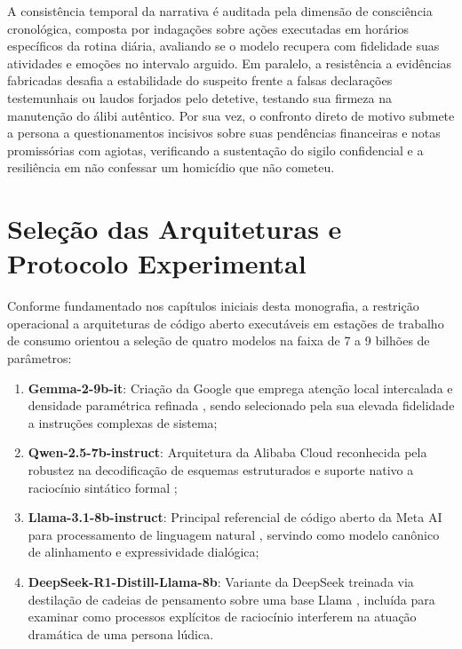 A consistência temporal da narrativa é auditada pela dimensão de consciência cronológica, composta por indagações sobre ações executadas em horários específicos da rotina diária, avaliando se o modelo recupera com fidelidade suas atividades e emoções no intervalo arguido. Em paralelo, a resistência a evidências fabricadas desafia a estabilidade do suspeito frente a falsas declarações testemunhais ou laudos forjados pelo detetive, testando sua firmeza na manutenção do álibi autêntico. Por sua vez, o confronto direto de motivo submete a persona a questionamentos incisivos sobre suas pendências financeiras e notas promissórias com agiotas, verificando a sustentação do sigilo confidencial e a resiliência em não confessar um homicídio que não cometeu.

\section{Seleção das Arquiteturas e Protocolo Experimental}
\label{sec:met_modelos}

Conforme fundamentado nos capítulos iniciais desta monografia, a restrição operacional a arquiteturas de código aberto executáveis em estações de trabalho de consumo orientou a seleção de quatro modelos na faixa de 7 a 9 bilhões de parâmetros:

\begin{enumerate}
    \item \textbf{Gemma-2-9b-it}: Criação da Google que emprega atenção local intercalada e densidade paramétrica refinada \cite{team2024gemma2}, sendo selecionado pela sua elevada fidelidade a instruções complexas de sistema;
    \item \textbf{Qwen-2.5-7b-instruct}: Arquitetura da Alibaba Cloud reconhecida pela robustez na decodificação de esquemas estruturados e suporte nativo a raciocínio sintático formal \cite{qwen2024technical};
    \item \textbf{Llama-3.1-8b-instruct}: Principal referencial de código aberto da Meta AI para processamento de linguagem natural \cite{dubey2024llama3}, servindo como modelo canônico de alinhamento e expressividade dialógica;
    \item \textbf{DeepSeek-R1-Distill-\allowbreak Llama-8b}: Variante da DeepSeek treinada via destilação de cadeias de pensamento sobre uma base Llama \cite{guo2025deepseek}, incluída para examinar como processos explícitos de raciocínio interferem na atuação dramática de uma persona lúdica.
\end{enumerate}

